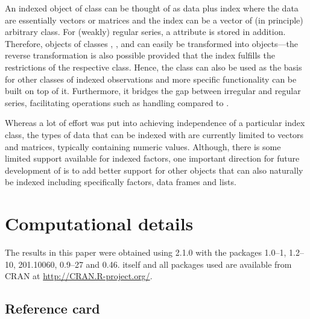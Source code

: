 \documentclass{Z}
\begin{document}
An indexed object of class  can be thought of as data plus index
where the data are essentially vectors or matrices and the index can be
a vector of (in principle) arbitrary class. For (weakly) regular 
series, a  attribute is stored in addition. Therefore, objects of classes
, ,  and  can easily
be transformed into  objects---the reverse transformation is also possible 
provided that the index fulfills the restrictions of the respective class.
Hence, the  class can also be used as the basis for other
classes of indexed observations and more specific functionality can be built on
top of it. Furthermore, it bridges the gap between irregular and regular series,
facilitating operations such as  handling compared to .

Whereas a lot of effort was put into achieving independence of a particular
index class, the types of data that can be indexed with  are currently
limited to vectors and matrices, typically containing numeric values. Although,
there is some limited support available for indexed factors, one important 
direction for future development of  is to add better support for other
objects that can also naturally be indexed including specifically factors, data
frames and lists.



\section*{Computational details}

The results in this paper were obtained using 
2.1.0 with the packages
 1.0--1,
 1.2--10,
 201.10060,
 0.9--27 and
 0.46.
 itself and all packages used are available from
CRAN at \url{http://CRAN.R-project.org/}.




\newpage

\begin{appendix}
\section{Reference card}

\end{appendix}
\end{document}
